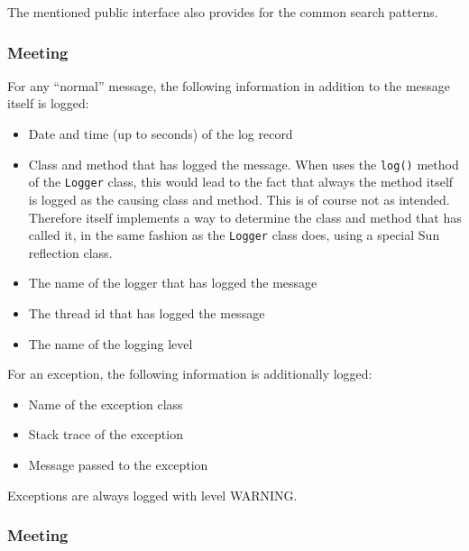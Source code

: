 The mentioned public interface also provides for the common search patterns.


\subsubsection{Meeting \REQUlogAnalysisInformation{}}
\label{sec:MeetingREQUlogAnalysisInformation}

For any ``normal'' message, the following information in addition to the message itself is logged:
\begin{itemize}
	\item Date and time (up to seconds) of the log record
	\item Class and method that has logged the message. When \COMPlogging{} uses the \texttt{log()} method of the \texttt{Logger} class, this would lead to the fact that always the \COMPlogging{} method itself is logged as the causing class and method. This is of course not as intended. Therefore \COMPlogging{} itself implements a way to determine the class and method that has called it, in the same fashion as the \texttt{Logger} class does, using a special Sun reflection class.
	\item The name of the logger that has logged the message
	\item The thread id that has logged the message
	\item The name of the logging level
\end{itemize}


For an exception, the following information is additionally logged:
\begin{itemize}
	\item Name of the exception class
	\item Stack trace of the exception
	\item Message passed to the exception
\end{itemize}

Exceptions are always logged with level WARNING.


\subsubsection{Meeting \REQUlogPreparedLocalisation{}}
\label{sec:MeetingREQUlogPreparedLocalisation}

